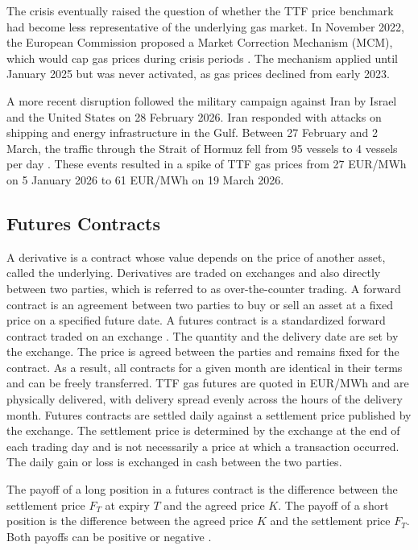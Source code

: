 The crisis eventually raised the question of whether the TTF price benchmark had become less representative of the underlying gas market. In November 2022, the European Commission proposed a Market Correction Mechanism (MCM), which would cap gas prices during crisis periods \parencite{europeancommissionQuestionsAnswersGas2022}. The mechanism applied until January 2025 but was never activated, as gas prices declined from early 2023.

A more recent disruption followed the military campaign against Iran by Israel and the United States on 28 February 2026. Iran responded with attacks on shipping and energy infrastructure in the Gulf. Between 27 February and 2 March, the traffic through the Strait of Hormuz fell from 95 vessels to 4 vessels per day \parencite{sharplesIranWarDisruption2026}. These events resulted in a spike of TTF gas prices from 27 EUR/MWh on 5 January 2026 to 61 EUR/MWh on 19 March 2026.

\subsection{Futures Contracts}\label{sec:futures}
A derivative is a contract whose value depends on the price of another asset, called the underlying. Derivatives are traded on exchanges and also directly between two parties, which is referred to as over-the-counter trading. A forward contract is an agreement between two parties to buy or sell an asset at a fixed price on a specified future date. A futures contract is a standardized forward contract traded on an exchange \parencite[28--30]{hullOptionsFuturesOther2022}.
The quantity and the delivery date are set by the exchange. The price is agreed between the parties and remains fixed for the contract. As a result, all contracts for a given month are identical in their terms and can be freely transferred. TTF gas futures are quoted in EUR/MWh and are physically delivered, with delivery spread evenly across the hours of the delivery month. Futures contracts are settled daily against a settlement price published by the exchange. The settlement price is determined by the exchange at the end of each trading day and is not necessarily a price at which a transaction occurred. The daily gain or loss is exchanged in cash between the two parties. 

The payoff of a long position in a futures contract is the difference between the settlement price $F_T$ at expiry $T$ and the agreed price $K$. The payoff of a short position is the difference between the agreed price $K$ and the settlement price $F_T$. Both payoffs can be positive or negative \parencite[29]{hullOptionsFuturesOther2022}.

